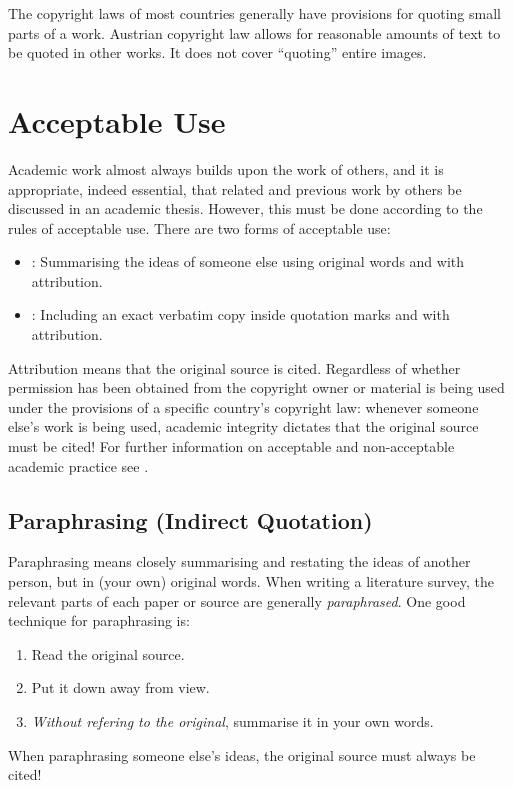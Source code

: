 The copyright laws of most countries generally have provisions for
quoting small parts of a work. Austrian copyright law \parencite[§
      42f]{UrhG} allows for reasonable amounts of text to be quoted in
other works. It does not cover ``quoting'' entire images.




\section{Acceptable Use}

Academic work almost always builds upon the work of others, and it is
appropriate, indeed essential, that related and previous work by
others be discussed in an academic thesis. However, this must be done
according to the rules of acceptable use. There are two forms of
acceptable use:
\begin{itemize}
      \item {}: Summarising the ideas
            of someone else using original words and with attribution.
      \item {}: Including an exact
            verbatim copy inside quotation marks and with attribution.
\end{itemize}
Attribution means that the original source is cited.
Regardless of whether permission has been obtained from the copyright
owner or material is being used under the provisions of a specific
country's copyright law: whenever someone else's work is being used,
academic integrity dictates that the original source must be cited!
%
For further information on acceptable and non-acceptable academic
practice see \parencite{FremdeFedern,Wikipedia-Zitat}.




\subsection{Paraphrasing (Indirect Quotation)}

Paraphrasing means closely summarising and restating the ideas of
another person, but in (your own) original words. When writing a
literature survey, the relevant parts of each paper or source are
generally \emph{paraphrased}. One good technique for paraphrasing is:
\begin{enumerate}
      \item Read the original source.
      \item Put it down away from view.
      \item \emph{Without refering to the original}, summarise it in your own words.
\end{enumerate}
When paraphrasing someone else's ideas, the original source must
always be cited!

